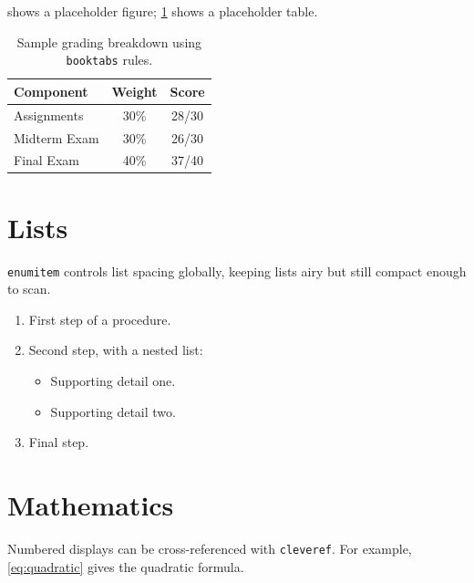          shows a placeholder figure; \cref{tab:booktabs} shows a placeholder table.

        \begin{table}[h]
            \centering
            \caption{Sample grading breakdown using \texttt{booktabs} rules.}
            \label{tab:booktabs}
            \begin{tabular}{lcc}
                \toprule
                \textbf{Component} & \textbf{Weight} & \textbf{Score} \\
                \midrule
                Assignments        & 30\%            & 28/30          \\
                Midterm Exam       & 30\%            & 26/30          \\
                Final Exam         & 40\%            & 37/40          \\
                \bottomrule
            \end{tabular}
        \end{table}

    \section{Lists}

        \texttt{enumitem} controls list spacing globally, keeping lists airy but still compact enough to scan.

        \begin{enumerate}
            \item First step of a procedure.
            \item Second step, with a nested list:
                \begin{itemize}
                    \item Supporting detail one.
                    \item Supporting detail two.
                \end{itemize}
            \item Final step.
        \end{enumerate}

    \section{Mathematics}

        Numbered displays can be cross-referenced with \texttt{cleveref}. For example, \cref{eq:quadratic}
        gives the quadratic formula.

